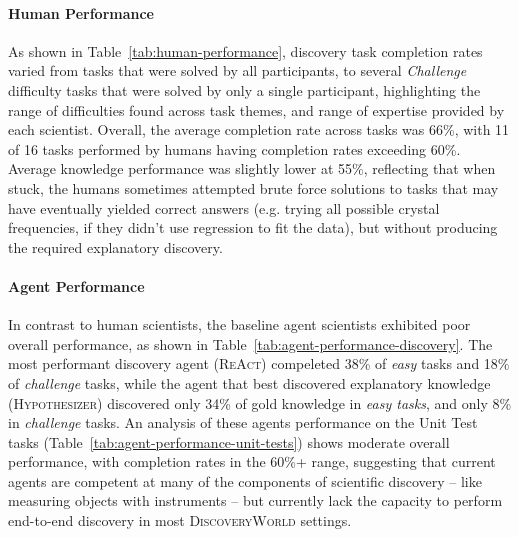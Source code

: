\documentclass{article}
\newcommand{\env}{\textsc{DiscoveryWorld}\xspace}
\begin{document}
\paragraph{Human Performance} As shown in Table~\ref{tab:human-performance}, discovery task completion rates varied from tasks that were solved by all participants, to several \textit{Challenge} difficulty tasks that were solved by only a single participant, highlighting the range of difficulties found across task themes, and range of expertise provided by each scientist.  Overall, the average completion rate across tasks was 66\%, with 11 of 16 tasks performed by humans having completion rates exceeding 60\%.  Average knowledge performance was slightly lower at 55\%, reflecting that when stuck, the humans sometimes attempted brute force solutions to tasks that may have eventually yielded correct answers (e.g. trying all possible crystal frequencies, if they didn't use regression to fit the data), but without producing the required explanatory discovery.

\paragraph{Agent Performance} In contrast to human scientists, the baseline agent scientists exhibited poor overall performance, as shown in Table~\ref{tab:agent-performance-discovery}.  The most performant discovery agent (\textsc{ReAct}) compeleted 38\% of \textit{easy} tasks and 18\% of \textit{challenge} tasks, while the agent that best discovered explanatory knowledge (\textsc{Hypothesizer}) discovered only 34\% of gold knowledge in \textit{easy tasks}, and only 8\% in \textit{challenge} tasks.  An analysis of these agents performance on the Unit Test tasks (Table~\ref{tab:agent-performance-unit-tests}) shows moderate overall performance, with completion rates in the 60\%+ range, suggesting that current agents are competent at many of the components of scientific discovery -- like measuring objects with instruments -- but currently lack the capacity to perform end-to-end discovery in most \env settings.  
\end{document}
